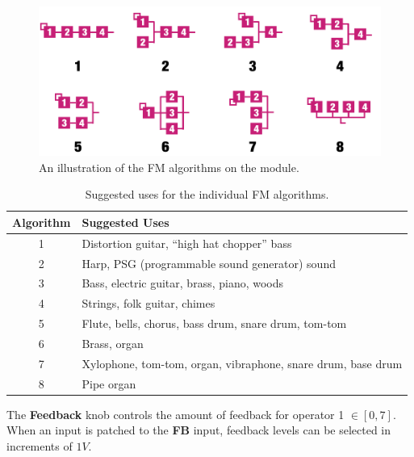 \documentclass[12pt,letter]{article}
\begin{document}
\begin{figure}[!htp]
\centering
\caption{An illustration of the FM algorithms on the module.}
\label{fig:fm-algorithms}
\includegraphics[width=\maxwidth{\textwidth}]{img/Operators}
\end{figure}

\begin{table}[!htp]
\centering
\caption{Suggested uses for the individual FM algorithms.}
\label{tab:fm-algorithm-instruments}
\begin{tabular}{|c|l|}
\hline
\textbf{Algorithm} & \textbf{Suggested Uses}                             \\
\hline\hline
1         & Distortion guitar, ``high hat chopper'' bass                 \\
\hline
2         & Harp, PSG (programmable sound generator) sound               \\
\hline
3         & Bass, electric guitar, brass, piano, woods                   \\
\hline
4         & Strings, folk guitar, chimes                                 \\
\hline
5         & Flute, bells, chorus, bass drum, snare drum, tom-tom         \\
\hline
6         & Brass, organ                                                 \\
\hline
7         & Xylophone, tom-tom, organ, vibraphone, snare drum, base drum \\
\hline
8         & Pipe organ                                                   \\
\hline
\end{tabular}
\end{table}

The \textbf{Feedback} knob controls the amount of feedback for operator 1 $\in [0, 7]$. When an input is patched to the \textbf{FB} input, feedback levels can be selected in increments of $1V$.
\end{document}
